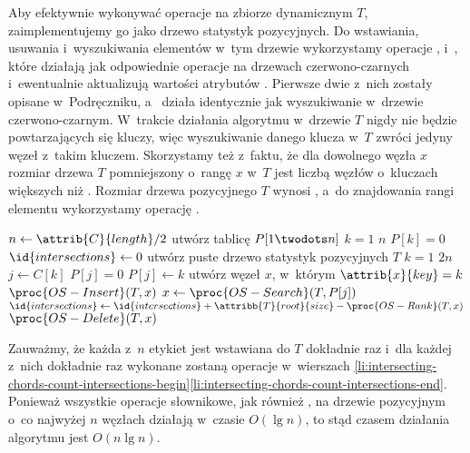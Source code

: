 Aby efektywnie wykonywać operacje na zbiorze dynamicznym $T$, zaimplementujemy go jako drzewo statystyk pozycyjnych.
Do wstawiania, usuwania i~wyszukiwania elementów w~tym drzewie wykorzystamy operacje ,  i~, które działają jak odpowiednie operacje na drzewach czerwono-czarnych i~ewentualnie aktualizują wartości atrybutów .
Pierwsze dwie z~nich zostały opisane w~Podręczniku, a~ działa identycznie jak wyszukiwanie w~drzewie czerwono-czarnym.
W~trakcie działania algorytmu w~drzewie $T$ nigdy nie będzie powtarzających się kluczy, więc wyszukiwanie danego klucza w~$T$ zwróci jedyny węzeł z~takim kluczem.
Skorzystamy też z~faktu, że dla dowolnego węzła $x$ rozmiar drzewa $T$ pomniejszony o~rangę $x$ w~$T$ jest liczbą węzłów o~kluczach większych niż .
Rozmiar drzewa pozycyjnego $T$ wynosi , a~do znajdowania rangi elementu wykorzystamy operację .
\begin{codebox}
\li $n\gets\attrib{C}{length}/2$
\li	utwórz tablicę $P[1\twodots n]$
\li	\For $k=1$ \To $n$
\li		\Do $P[k]=0$
		\End
\li	$\id{intersections}\gets0$
\li	utwórz puste drzewo statystyk pozycyjnych $T$
\li	\For $k=1$ \To $2n$
\li		\Do $j\gets C[k]$
\li			\If $P[j]=0$
\li				\Then $P[j]\gets k$
\li					utwórz węzeł $x$, w~którym $\attrib{x}{key}=k$
\li					$\proc{OS-Insert}(T,x)$
\li				\Else $x\gets\proc{OS-Search}(T,P[j])$ \label{li:intersecting-chords-count-intersections-begin}
\li					$\id{intersections}\gets\id{intersections}+\attribb{T}{root}{size}-\proc{OS-Rank}(T,x)$
\li					$\proc{OS-Delete}(T,x)$
				\End \label{li:intersecting-chords-count-intersections-end}
		\End
\li	\Return {}
\end{codebox}

Zauważmy, że każda z~$n$ etykiet jest wstawiana do $T$ dokładnie raz i~dla każdej z~nich dokładnie raz wykonane zostaną operacje w~wierszach \ref{li:intersecting-chords-count-intersections-begin}\nbendash\ref{li:intersecting-chords-count-intersections-end}.
Ponieważ wszystkie operacje słownikowe, jak również , na drzewie pozycyjnym o~co najwyżej $n$ węzłach działają w~czasie $O(\lg n)$, to stąd czasem działania algorytmu jest $O(n\lg n)$.

